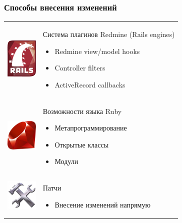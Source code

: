\documentclass[unicode]{beamer}
\begin{document}
\begin{frame}
\transwipe[direction=90]
\frametitle{Способы внесения изменений}
\begin{tabular}{ >{\centering\arraybackslash}m{3.5cm}  >{\centering\arraybackslash}m{5cm} }
\includegraphics[width=1.5cm]{Ruby_on_Rails.pdf}&
\begin{minipage}{3in}
\begin{block}{Система плагинов Redmine (Rails engines)}
\begin{itemize}
  \item Redmine view/model hooks
  \item Controller filters
  \item ActiveRecord callbacks
\end{itemize}
\end{block}
\end{minipage}\\

\includegraphics[width=1.5cm]{Ruby_logo.pdf}&
\begin{minipage}{3in}
\begin{block}{Возможности языка Ruby}
\begin{itemize}
  \item Метапрограммирование
  \item Открытые классы
  \item Модули
\end{itemize}
\end{block}
\end{minipage}\\

\includegraphics[width=1.5cm]{patch-management.jpg}&
\begin{minipage}{3in}
\begin{block}{Патчи}
\begin{itemize}
  \item Внесение изменений напрямую
\end{itemize}
\end{block}
\end{minipage}\\
\end{tabular}
\end{frame}
\end{document}
